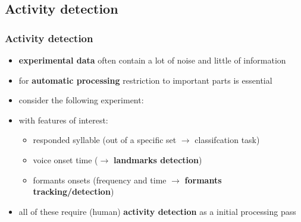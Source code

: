
\subsection{Activity detection}

\begin{frame} %
	\frametitle{Activity detection}
	\begin{itemize}
		\item \textbf{experimental data} often contain a lot of noise and little of information
		\item for \textbf{automatic processing} restriction to important parts is essential
		\item consider the following experiment:
			\begin{figure}
				\centering
				\begin{subfigure}[c]{0.8\linewidth}
				\end{subfigure}
			\end{figure}
		\item with features of interest:
			\begin{itemize}
				\item responded syllable (out of a specific set $\rightarrow$ classifcation task)
				\item voice onset time ($\rightarrow$ \textbf{landmarks detection})
				\item formants onsets (frequency and time $\rightarrow$ \textbf{formants tracking/detection})
			\end{itemize}
		\item all of these require (human) \textbf{activity detection} as a initial processing pass
	\end{itemize}
\end{frame}

